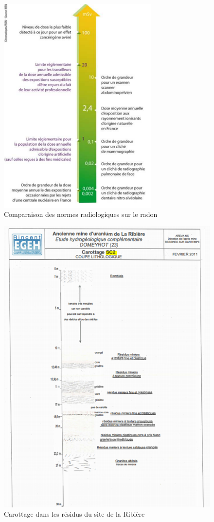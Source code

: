 \documentclass{article}
\begin{document}
\begin{figure}[H]
    \centering
    \includegraphics[width=8cm]{II_A2_5.png}
    \caption{Comparaison des normes radiologiques sur le radon}
    \label{fig:comparaison_normes}
\end{figure}

\begin{figure}[H]
    \centering
    \includegraphics[width = 14.5cm]{III_C_1.png}
    \caption{Carottage dans les résidus du site de la Ribière}
    \label{fig:carottage_residus}
\end{figure}
\end{document}
